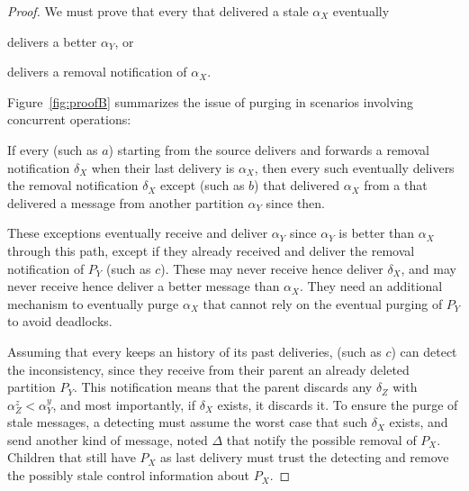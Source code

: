 \begin{proof}
  We must prove that every \process that delivered a stale $\alpha_X$
  eventually
  \begin{inparaenum}[(i)]
  \item delivers a better $\alpha_Y$, or 
  \item delivers a removal notification of $\alpha_X$.
  \end{inparaenum}
  Figure~\ref{fig:proofB} summarizes the issue of purging in scenarios
  involving concurrent operations:

  If every \process (such as $a$) starting from the source delivers
  and forwards a removal notification $\delta_X$ when their last
  delivery is $\alpha_X$, then every such \process eventually delivers
  the removal notification $\delta_X$ except \processes (such as $b$)
  that delivered $\alpha_X$ from a \process that delivered a message
  from another partition $\alpha_Y$ since then.
  
  These exceptions eventually receive and deliver $\alpha_Y$ since
  $\alpha_Y$ is better than $\alpha_X$ through this path, except if
  they already received and deliver the removal notification of $P_Y$
  (such as $c$). These \processes may never receive hence deliver
  $\delta_X$, and may never receive hence deliver a better message
  than $\alpha_X$. They need an additional mechanism to eventually
  purge $\alpha_X$ that cannot rely on the eventual purging of $P_Y$
  to avoid deadlocks.
  
  Assuming that every \process keeps an history of its past
  deliveries, \processes (such as $c$) can detect the inconsistency,
  since they receive from their parent an already deleted partition
  $P_Y$. This notification means that the parent discards any
  $\delta_Z$ with $\alpha_Z^z < \alpha_Y^y$, and most importantly, if
  $\delta_X$ exists, it discards it. To ensure the purge of stale
  messages, a detecting \process must assume the worst case that such
  $\delta_X$ exists, and send another kind of message, noted $\Delta$
  that notify the possible removal of $P_X$. Children \processes that
  still have $P_X$ as last delivery must trust the detecting \process
  and remove the possibly stale control information about $P_X$.
  



\end{proof}
